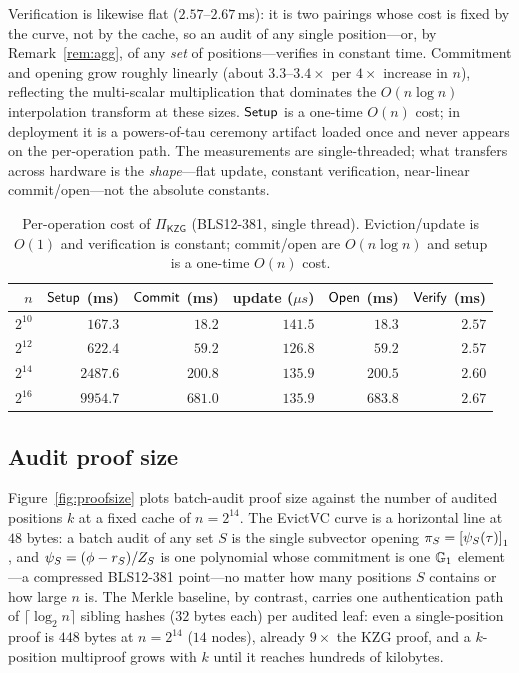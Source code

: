Verification is likewise flat ($2.57$--$2.67\,$ms): it is two pairings whose cost
is fixed by the curve, not by the cache, so an audit of any single position---or,
by Remark~\ref{rem:agg}, of any \emph{set} of positions---verifies in constant
time. Commitment and opening grow roughly linearly (about $3.3$--$3.4\times$ per
$4\times$ increase in $n$), reflecting the multi-scalar multiplication that
dominates the $O(n\log n)$ interpolation transform at these sizes. $\mathsf{Setup}$ is a
one-time $O(n)$ cost; in deployment it is a powers-of-tau ceremony artifact loaded
once and never appears on the per-operation path. The measurements are
single-threaded; what transfers across hardware is the \emph{shape}---flat
update, constant verification, near-linear commit/open---not the absolute
constants.

\begin{table}[t]\centering
\renewcommand{\arraystretch}{1.1}
\begin{tabular}{@{}rrrrrr@{}}
\toprule
$n$ & $\mathsf{Setup}$ (ms) & $\mathsf{Commit}$ (ms) & update ($\mu s$) & $\mathsf{Open}$ (ms) & $\mathsf{Verify}$ (ms)\\
\midrule
$2^{10}$ & $167.3$  & $18.2$  & $141.5$ & $18.3$  & $2.57$\\
$2^{12}$ & $622.4$  & $59.2$  & $126.8$ & $59.2$  & $2.57$\\
$2^{14}$ & $2487.6$ & $200.8$ & $135.9$ & $200.5$ & $2.60$\\
$2^{16}$ & $9954.7$ & $681.0$ & $135.9$ & $683.8$ & $2.67$\\
\bottomrule
\end{tabular}
\caption{Per-operation cost of $\Pi_{\mathsf{KZG}}$ (BLS12-381, single thread).
Eviction/update is $O(1)$ and verification is constant; commit/open are
$O(n\log n)$ and setup is a one-time $O(n)$ cost.}
\label{tab:maint}
\end{table}

\subsection{Audit proof size}
Figure~\ref{fig:proofsize} plots batch-audit proof size against the number of
audited positions $k$ at a fixed cache of $n=2^{14}$. The EvictVC curve is a
horizontal line at $48$ bytes: a batch audit of any set $S$ is the single
subvector opening $\pi_S=\left[\psi_S(\tau)\right]_{1}$, and
$\psi_S=(\phi-r_S)/Z_S$ is one polynomial whose commitment is one $\mathbb{G}_1$
element---a compressed BLS12-381 point---no matter how many positions $S$
contains or how large $n$ is. The Merkle baseline, by contrast, carries one
authentication path of $\lceil\log_2 n\rceil$ sibling hashes ($32$ bytes each)
per audited leaf: even a single-position proof is $448$ bytes at $n=2^{14}$
($14$ nodes), already $9\times$ the KZG proof, and a $k$-position multiproof grows
with $k$ until it reaches hundreds of kilobytes.

